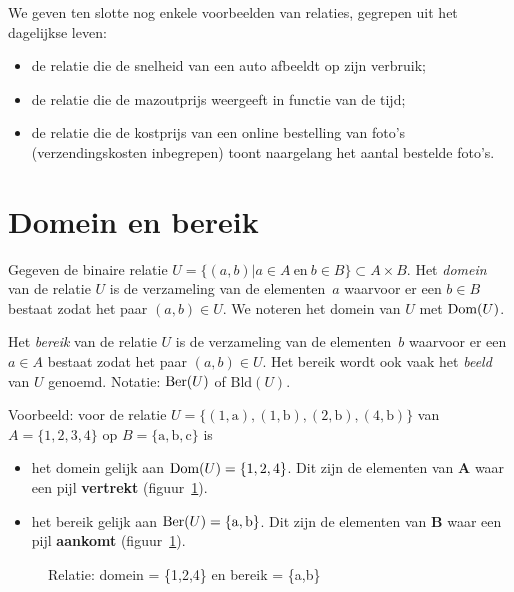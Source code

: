 We geven ten slotte nog enkele voorbeelden van relaties, gegrepen uit het dagelijkse leven:
\begin{itemize}
\item de relatie die de snelheid van een auto afbeeldt op zijn verbruik;
\item de relatie die de mazoutprijs weergeeft in functie van de tijd;
\item de relatie die de kostprijs van een online bestelling van foto's (verzendingskosten inbegrepen) toont naargelang het aantal bestelde foto's.
\end{itemize}

\section{Domein en bereik}
\label{sec:domeinBereik}
Gegeven de binaire relatie $U=\{({a},{b})|{a}\in A \mathrm{~ en~} {b} \in B\}\subset A \times B$. 
Het \emph{domein} van de relatie $U$ is de verzameling van de elementen~${a}$ waarvoor er een $b\in B$ 
bestaat zodat het paar $({a},{b})\in U$. We noteren het domein van $U$ met $\text{Dom}(U)$.

Het \emph{bereik} van de relatie $U$ is de verzameling van de elementen~${b}$
waarvoor er een $a\in A$ bestaat zodat het paar $({a},{b})\in U$. Het bereik wordt ook vaak het \emph{beeld} van $U$ genoemd.
Notatie: $\text{Ber}(U)$ of $\text{Bld}(U)$.

Voorbeeld: voor de relatie $U=\{(1,\mathrm{a}),(1,\mathrm{b}),(2,\mathrm{b}),(4,\mathrm{b}) \}$ van $A=\{1,2,3,4\}$ op $B=\{\mathrm{a},\mathrm{b},\mathrm{c} \}$ is 
\begin{itemize}
\item het domein gelijk aan $\text{Dom}(U)=\{1,2,4\}$. Dit zijn de elementen van $\mathbf{A}$ waar een pijl \textbf{vertrekt} (figuur~\ref{fig:dombereik}).
\item het bereik gelijk aan $\text{Ber}(U)=\{ \mathrm{a},\mathrm{b}\}$. Dit zijn de elementen van $\mathbf{B}$ waar een pijl \textbf{aankomt} (figuur~\ref{fig:dombereik}).
\end{itemize}

\begin{figure}[htbp]
\centering

\caption{Relatie: domein = \{1,2,4\} en bereik = \{a,b\}}
\label{fig:dombereik}
\end{figure}


